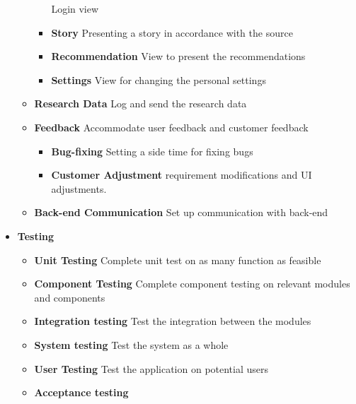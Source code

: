 \begin{appendices}
\begin{itemize}
\begin{itemize}
\begin{itemize}
					Login view
					\item \textbf{Story} \newline
					Presenting a story in accordance with the source
					\item \textbf{Recommendation } \newline
					View to present the recommendations 
					\item \textbf{Settings} \newline
					View for changing the personal settings
				\end{itemize}
				\item \textbf{Research Data} \newline
				Log and send the research data
				\item \textbf{Feedback} \newline
				Accommodate user feedback and customer feedback 
				\begin{itemize}
					\item \textbf{Bug-fixing} \newline
					Setting a side time for fixing bugs
					\item \textbf{Customer Adjustment} \newline
					requirement modifications and UI adjustments.
				\end{itemize}
				\item \textbf{Back-end Communication} \newline
				Set up communication with back-end
			\end{itemize}
	\item \textbf{Testing}
		\begin{itemize}
			\item \textbf{Unit Testing} \newline
			Complete unit test on as many function as feasible 
			\item \textbf{Component Testing} \newline
			Complete component testing on relevant modules and components 
			\item \textbf{Integration testing} \newline
			Test the integration between the modules
			\item \textbf{System testing} \newline
			Test the system as a whole
			\item \textbf{User Testing } \newline
			Test the application on potential users 
			\item \textbf{Acceptance testing} \newline

\end{itemize}
\end{itemize}
\end{appendices}
